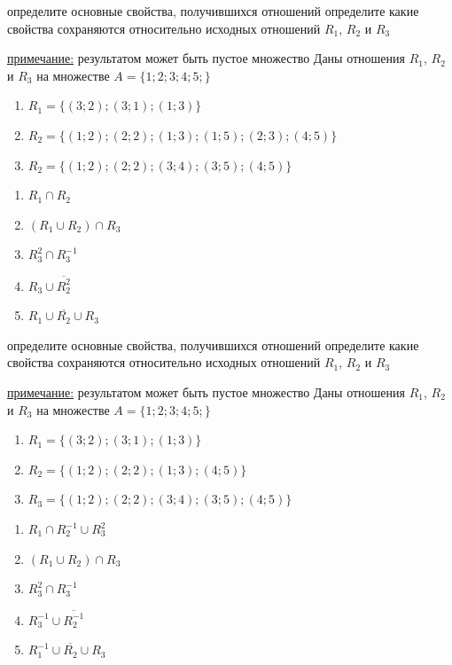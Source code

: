 \documentclass[10pt]{exam}
\begin{document}
\begin{questions}
определите основные свойства, получившихся отношений
определите какие свойства сохраняются относительно исходных отношений $R_1$, $R_2$ и $R_3$

\underline{примечание:} результатом может быть пустое множество\question
Даны отношения $R_1$, $R_2$ и $R_3$ на множестве $A = \{1; 2; 3; 4; 5;\}$ 
\begin{enumerate}
	\renewcommand{\labelenumi}{\alph{enumi})}
	\item $R_1 = \{(3; 2); (3; 1); (1; 3)\}$
	\item $R_2 = \{(1; 2); (2; 2); (1; 3); (1; 5); (2; 3); (4; 5)\}$
	\item $R_2 = \{(1; 2); (2; 2); (3; 4); (3; 5); (4; 5)\}$
\end{enumerate}

\begin{enumerate}
	\renewcommand{\labelenumi}{\alph{enumi})}
	\item $R_1 \cap R_2$
	\item $(R_1 \cup R_2) \cap R_3$
	\item $R_3^2 \cap R_3^{-1}$
	\item $R_3 \cup \overline{R_2^2}$
	\item $R_1 \cup \overline{R_2} \cup R_3$
\end{enumerate}

определите основные свойства, получившихся отношений
определите какие свойства сохраняются относительно исходных отношений $R_1$, $R_2$ и $R_3$ 

\underline{примечание:} результатом может быть пустое множество\question
Даны отношения $R_1$, $R_2$ и $R_3$ на множестве $A = \{1; 2; 3; 4; 5;\}$ 
\begin{enumerate}
	\renewcommand{\labelenumi}{\alph{enumi})}
	\item $R_1 = \{(3; 2); (3; 1); (1; 3)\}$
	\item $R_2 = \{(1; 2); (2; 2); (1; 3); (4; 5)\}$
	\item $R_3 = \{(1; 2); (2; 2); (3; 4); (3; 5); (4; 5)\}$
\end{enumerate}

\begin{enumerate}
	\renewcommand{\labelenumi}{\alph{enumi})}
	\item $R_1 \cap R_2^{-1} \cup R_3^2$
	\item $(R_1 \cup R_2) \cap R_3$
	\item $R_3^2 \cap R_3^{-1}$
	\item $R_3^{-1} \cup \overline{R_2^{-1}}$
	\item $R_1^{-1} \cup \overline{R_2} \cup R_3$
\end{enumerate}


\end{questions}
\end{document}
